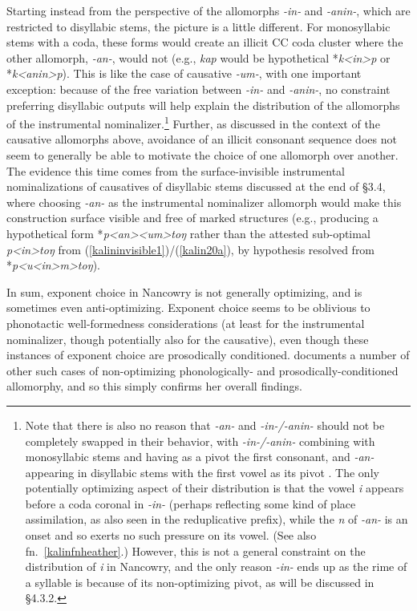 \documentclass[output=paper,colorlinks,citecolor=brown,
]{langscibook}
\begin{document}
Starting instead from the perspective of the allomorphs \textit{-in-} and \textit{-anin-}, which are restricted to disyllabic stems, the picture is a little different. For monosyllabic stems with a coda, these forms would create an illicit CC coda cluster where the other allomorph, \textit{-an-}, would not (e.g., \textit{kap} would be hypothetical *\textit{k<in>p} or *\textit{k<anin>p}). This is like the case of causative \textit{-um-}, with one important exception:  because of the free variation between \textit{-in-} and \textit{-anin-}, no constraint preferring disyllabic outputs will help explain the distribution of the allomorphs of the instrumental nominalizer.\footnote{Note that there is also no reason that \textit{-an-} and \textit{-in-/-anin-} should not be completely swapped in their behavior, with \textit{-in-/-anin-} combining with monosyllabic stems and having as a pivot the first consonant, and \textit{-an-} appearing in disyllabic stems with the first vowel as its pivot \citep[167-168]{Paster06}. The only potentially optimizing aspect of their distribution is that the vowel \textit{i} appears before a coda coronal in \textit{-in-} (perhaps reflecting some kind of place assimilation, as also seen in the reduplicative prefix), while the \textit{n} of \textit{-an-} is an onset and so exerts no such pressure on its vowel. (See also fn.\ \ref{kalinfnheather}.) However, this is not a general constraint on the distribution of \textit{i} in Nancowry, and the only reason \textit{-in-} ends up as the rime of a syllable is because of its non-optimizing pivot, as will be discussed in \S4.3.2.} Further, as discussed in the context of the causative allomorphs above, avoidance of an illicit consonant sequence does not seem to generally be able to motivate the choice of one allomorph over another. The evidence this time comes from the surface-invisible instrumental nominalizations of causatives of disyllabic stems discussed at the end of \S3.4, where choosing \textit{-an-} as the instrumental nominalizer allomorph would make this construction surface visible and free of marked structures (e.g., producing a hypothetical form *\textit{p<an><um>toŋ} rather than the attested sub-optimal \textit{p<in>toŋ} from (\ref{kalininvisible1})/(\ref{kalin20a}), by hypothesis resolved from *\textit{p<u<in>m>toŋ}). 

In sum, exponent choice in Nancowry is not generally optimizing, and is sometimes even anti-optimizing. Exponent choice seems to be oblivious to phonotactic well-formedness considerations (at least for the instrumental nominalizer, though potentially also for the causative), even though these instances of exponent choice are prosodically conditioned. \citet{Paster05,Paster06} documents a number of other such cases of non-optimizing phonologically- and prosodically-conditioned allomorphy, and so this simply confirms her overall findings.
\end{document}
